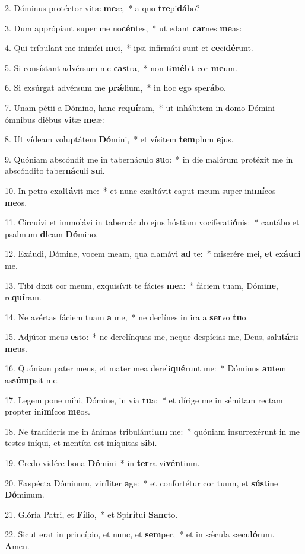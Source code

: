 2. Dóminus protéctor vitæ \textbf{me}æ,~*  a quo \textbf{tre}pi\textbf{dá}bo?\

3. Dum apprópiant super me no\textbf{cén}tes,~*  ut edant \textbf{car}nes \textbf{me}as:\

4. Qui tríbulant me inimíci \textbf{me}i,~*  ipsi infirmáti sunt et \textbf{ce}ci\textbf{dé}runt.\

5. Si consístant advérsum me \textbf{cas}tra,~*  non ti\textbf{mé}bit cor \textbf{me}um.\

6. Si exsúrgat advérsum me \textbf{prǽ}lium,~*  in hoc \textbf{e}go spe\textbf{rá}bo.\

7. Unam pétii a Dómino, hanc re\textbf{quí}ram,~*  ut inhábitem in domo Dómini ómnibus diébus \textbf{vi}tæ \textbf{me}æ:\

8. Ut vídeam voluptátem \textbf{Dó}mini,~*  et vísitem \textbf{tem}plum \textbf{e}jus.\

9. Quóniam abscóndit me in tabernáculo \textbf{su}o:~*  in die malórum protéxit me in abscóndito taber\textbf{ná}culi \textbf{su}i.\

10. In petra exal\textbf{tá}vit me:~*  et nunc exaltávit caput meum super ini\textbf{mí}cos \textbf{me}os.\

11. Circuívi et immolávi in tabernáculo ejus hóstiam vociferati\textbf{ó}nis:~*  cantábo et psalmum \textbf{di}cam \textbf{Dó}mino.\

12. Exáudi, Dómine, vocem meam, qua clamávi \textbf{ad} te:~*  miserére mei, \textbf{et} ex\textbf{áu}di me.\

13. Tibi dixit cor meum, exquisívit te fácies \textbf{me}a:~*  fáciem tuam, Dómi\textbf{ne}, re\textbf{quí}ram.\

14. Ne avértas fáciem tuam \textbf{a} me,~*  ne declínes in ira a \textbf{ser}vo \textbf{tu}o.\

15. Adjútor meus \textbf{es}to:~*  ne derelínquas me, neque despícias me, Deus, salu\textbf{tá}ris \textbf{me}us.\

16. Quóniam pater meus, et mater mea dereli\textbf{qué}runt me:~*  Dóminus \textbf{au}tem as\textbf{súmp}sit me.\

17. Legem pone mihi, Dómine, in via \textbf{tu}a:~*  et dírige me in sémitam rectam propter ini\textbf{mí}cos \textbf{me}os.\

18. Ne tradíderis me in ánimas tribulánti\textbf{um} me:~*  quóniam insurrexérunt in me testes iníqui, et mentíta est in\textbf{í}quitas \textbf{si}bi.\

19. Credo vidére bona \textbf{Dó}mini~*  in \textbf{ter}ra vi\textbf{vén}tium.\

20. Exspécta Dóminum, viríliter \textbf{a}ge:~*  et confortétur cor tuum, et \textbf{sús}tine \textbf{Dó}minum.\

21. Glória Patri, et \textbf{Fí}lio,~*  et Spi\textbf{rí}tui \textbf{Sanc}to.\

22. Sicut erat in princípio, et nunc, et \textbf{sem}per,~*  et in sǽcula sæcu\textbf{ló}rum. \textbf{A}men.\

